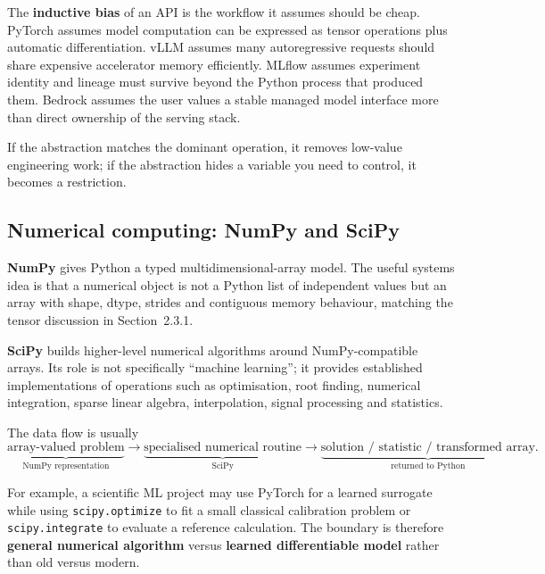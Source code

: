 The \textbf{inductive bias} of an API is the workflow it assumes should be cheap.
PyTorch assumes model computation can be expressed as tensor operations plus automatic differentiation.
vLLM assumes many autoregressive requests should share expensive accelerator memory efficiently.
MLflow assumes experiment identity and lineage must survive beyond the Python process that produced them.
Bedrock assumes the user values a stable managed model interface more than direct ownership of the serving stack.

\begin{calloutinductivebias}
If the abstraction matches the dominant operation, it removes low-value engineering work; if the abstraction hides a variable you need to control, it becomes a restriction.
\end{calloutinductivebias}


\subsection{Numerical computing: NumPy and SciPy}

\textbf{NumPy} gives Python a typed multidimensional-array model.
The useful systems idea is that a numerical object is not a Python list of independent values but an array with shape, dtype, strides and contiguous memory behaviour, matching the tensor discussion in Section~2.3.1.

\textbf{SciPy} builds higher-level numerical algorithms around NumPy-compatible arrays.
Its role is not specifically ``machine learning''; it provides established implementations of operations such as optimisation, root finding, numerical integration, sparse linear algebra, interpolation, signal processing and statistics.

The data flow is usually
\[
\underbrace{\text{array-valued problem}}_{\text{NumPy representation}}
\rightarrow
\underbrace{\text{specialised numerical routine}}_{\text{SciPy}}
\rightarrow
\underbrace{\text{solution / statistic / transformed array}}_{\text{returned to Python}}.
\]

For example, a scientific ML project may use PyTorch for a learned surrogate while using \texttt{scipy.optimize} to fit a small classical calibration problem or \texttt{scipy.integrate} to evaluate a reference calculation.
The boundary is therefore \textbf{general numerical algorithm} versus \textbf{learned differentiable model} rather than old versus modern.

